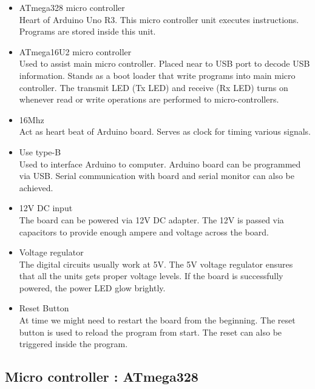     \begin{itemize}
        \item ATmega328 micro controller \\
        Heart of Arduino Uno R3. This micro controller unit executes instructions. Programs are stored inside this unit.
        \item ATmega16U2 micro controller\\
        Used to assist main micro controller. Placed near to USB port to decode USB information. Stands as a boot loader that write programs into main micro controller. The transmit LED (Tx LED) and receive (Rx LED) turns on whenever read or write operations are performed to micro-controllers. 
        \item 16Mhz\\
        Act as heart beat of Arduino board. Serves as clock for timing various signals.
        \item Use type-B\\
        Used to interface Arduino to computer. Arduino board can be programmed via USB. Serial communication with board and serial monitor can also be achieved.
        \item 12V DC input\\
        The board can be powered via 12V DC adapter. The 12V is passed via capacitors to provide enough ampere and voltage across the board.
        \item Voltage regulator\\
        The digital circuits usually work at 5V. The 5V voltage regulator ensures that all the units gets proper voltage levels. If the board is successfully powered, the power LED glow brightly.
        \item Reset Button\\
        At time we might need to restart the board from the beginning. The reset button is used to reload the program from start. The reset can also be triggered inside the program.
    \end{itemize}
    
    \subsection{Micro controller : ATmega328}
    
